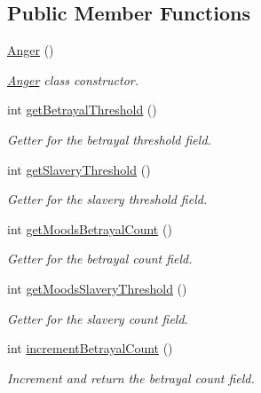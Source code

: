 \subsection*{Public Member Functions}
\begin{DoxyCompactItemize}
\item 
\hyperlink{classgameplay_1_1ai_1_1mood_1_1_anger_aa4d68a49953f6fc22119d8825fd7e3d0}{Anger} ()
\begin{DoxyCompactList}\small\item\em \hyperlink{classgameplay_1_1ai_1_1mood_1_1_anger}{Anger} class constructor. \end{DoxyCompactList}\item 
int \hyperlink{classgameplay_1_1ai_1_1mood_1_1_mood_a766902de5008b4ff54729075fe0b66a6}{get\-Betrayal\-Threshold} ()
\begin{DoxyCompactList}\small\item\em Getter for the betrayal threshold field. \end{DoxyCompactList}\item 
int \hyperlink{classgameplay_1_1ai_1_1mood_1_1_mood_a8c5dda351cf131a2e2a30a1570e2c7e7}{get\-Slavery\-Threshold} ()
\begin{DoxyCompactList}\small\item\em Getter for the slavery threshold field. \end{DoxyCompactList}\item 
int \hyperlink{classgameplay_1_1ai_1_1mood_1_1_mood_aae8ae123bc9d3bae48e08ad15528aa5b}{get\-Moods\-Betrayal\-Count} ()
\begin{DoxyCompactList}\small\item\em Getter for the betrayal count field. \end{DoxyCompactList}\item 
int \hyperlink{classgameplay_1_1ai_1_1mood_1_1_mood_a859eb2f9bae00ce3604d0fea5a690900}{get\-Moods\-Slavery\-Threshold} ()
\begin{DoxyCompactList}\small\item\em Getter for the slavery count field. \end{DoxyCompactList}\item 
int \hyperlink{classgameplay_1_1ai_1_1mood_1_1_mood_a322adb08d4a6f7dcd0eb00c77649d2d2}{increment\-Betrayal\-Count} ()
\begin{DoxyCompactList}\small\item\em Increment and return the betrayal count field. \end{DoxyCompactList}\item 

\end{DoxyCompactItemize}
